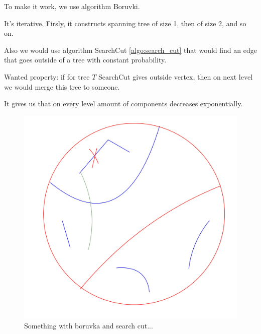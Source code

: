 \begin{claim}
  To make it work, we use algorithm Boruvki.

  It's iterative. Firsly, it constructs spanning tree of size 1, then of size 2, and so on.

  Also we would use algorithm SearchCut \ref{algo:search_cut} that would find an edge that goes outside of a tree with constant probability. 

  Wanted property: if for tree $T$ SearchCut gives outside vertex, then on next level we would merge this tree to someone.

  It gives us that on every level amount of components decreases exponentially.

  \begin{figure}[H]
  	\centering
  	\includegraphics[width=0.5\linewidth]{figures/boruvka_search_cut.jpeg}
  	\caption{Something with boruvka and search cut...}
  	\label{fig:boruvka_search_cut}
  \end{figure}
\end{claim}
